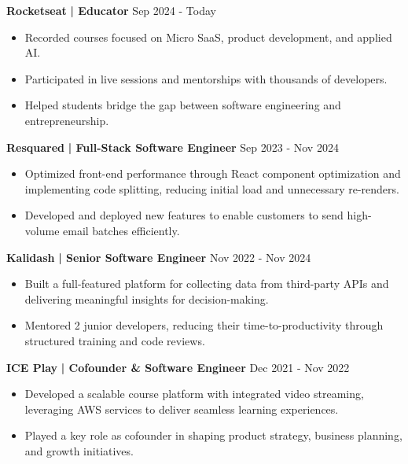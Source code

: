 \documentclass[a4paper]{article}
\begin{document}
           \textbf{Rocketseat}\textbf{ | Educator } \hfill  Sep 2024 - Today\\
    \vspace{-3mm}
    \begin{itemize} \itemsep -3pt
    \item Recorded courses focused on Micro SaaS, product development, and applied AI.
    \item Participated in live sessions and mentorships with thousands of developers.
    \item Helped students bridge the gap between software engineering and entrepreneurship.
\end{itemize}

    \textbf{Resquared}\textbf{ | Full-Stack Software Engineer} \hfill  Sep 2023 - Nov 2024\\
    \vspace{-3mm}
    \begin{itemize} \itemsep -3pt
        \item Optimized front-end performance through React component optimization and implementing code splitting, reducing initial load and unnecessary re-renders.
        \item Developed and deployed new features to enable customers to send high-volume email batches efficiently.
    \end{itemize}

    \textbf{Kalidash}\textbf{ | Senior Software Engineer } \hfill  Nov 2022 - Nov 2024\\
    \vspace{-3mm}
    \begin{itemize} \itemsep -3pt
        \item Built a full-featured platform for collecting data from third-party APIs and delivering meaningful insights for decision-making.
        \item Mentored 2 junior developers, reducing their time-to-productivity through structured training and code reviews.
    \end{itemize}

    \textbf{ICE Play}\textbf{ | Cofounder \& Software Engineer} \hfill  Dec 2021 - Nov 2022\\
    \vspace{-3mm}
    \begin{itemize} \itemsep -3pt
        \item Developed a scalable course platform with integrated video streaming, leveraging AWS services to deliver seamless learning experiences.
        \item Played a key role as cofounder in shaping product strategy, business planning, and growth initiatives.
    \end{itemize}
\end{document}
